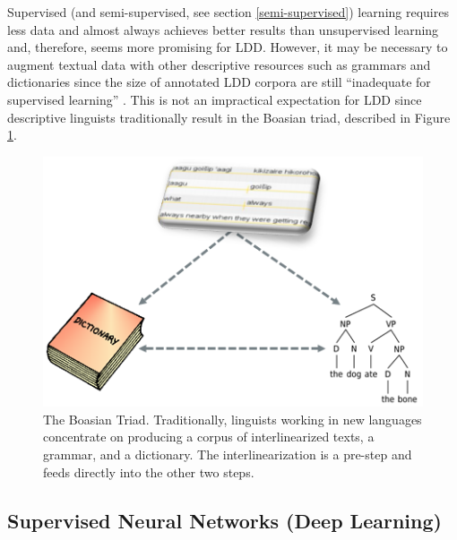 \documentclass[12pt]{article}
\begin{document}
Supervised (and semi-supervised, see section \ref{semi-supervised}) learning requires less data and almost always achieves better results than unsupervised learning \cite{ruokolainen_supervised_2013} and, therefore, seems more promising for LDD. However, it may be necessary to augment textual data with other descriptive resources such as grammars and dictionaries since the size of annotated LDD corpora are still ``inadequate for supervised learning'' \cite[page 18]{duong_natural_2017}. This is not an impractical expectation for LDD since descriptive linguists traditionally result in the Boasian triad, described in Figure \ref{fig:Triad}.

\begin{figure}[ht]
\begin{center}
\includegraphics[width=0.7\columnwidth]{Triad.PNG}
\caption{The Boasian Triad. Traditionally, linguists working in new languages concentrate on producing a corpus of interlinearized texts, a grammar, and a dictionary. The interlinearization is a pre-step and feeds directly into the other two steps.}
\label{fig:Triad}
\end{center}
\end{figure}

\subsection{Supervised Neural Networks (Deep Learning)}
\label{sec:NN}
\end{document}
